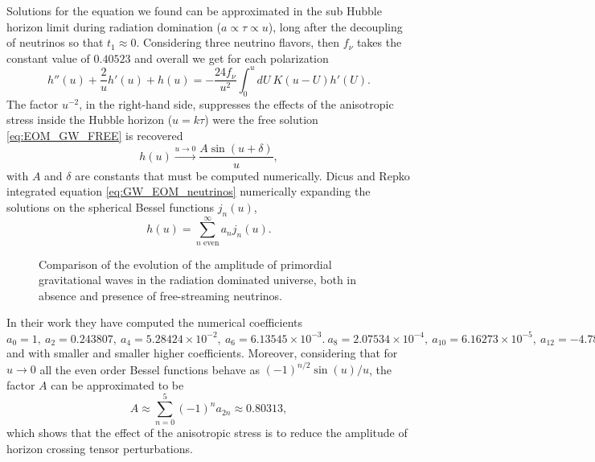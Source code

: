 Solutions for the equation we found can be approximated in the sub Hubble horizon limit during radiation domination ($a\propto\tau\propto u$), long after the decoupling of neutrinos so that $t_1\approx 0$. Considering three neutrino flavors, then $f_\nu$ takes the constant value of $0.40523$ and overall we get for each polarization
$$ h''(u)+\frac{2}{u}h'(u)+h(u)=-\frac{24f_\nu}{u^2}\int_{0}^{u}dU\ K(u-U)h'(U).$$
The factor $u^{-2}$, in the right-hand side, suppresses the effects of the anisotropic stress inside the Hubble horizon ($u=k\tau$) were the free solution \eqref{eq:EOM_GW_FREE} is recovered
$$h(u)\xrightarrow{u\to 0} \frac{A\sin(u+\delta)}{u},$$
with $A$ and $\delta$ are constants that must be computed numerically. Dicus and Repko \cite{Dicus_Repko} integrated equation \eqref{eq:GW_EOM_neutrinos} numerically expanding the solutions on the spherical Bessel functions $j_n(u)$,
\begin{equation}
    \label{eq:Tmodes_nu_damped}
    h(u)=\sum_{n\text{ even}}^{\infty}a_n j_n(u).
\end{equation}
\begin{figure}
    \centering
{}
\caption{Comparison of the evolution of the amplitude of primordial gravitational waves in the radiation dominated universe, both in absence and presence of free-streaming neutrinos. }
\label{fig:h_nu}
\end{figure}
 In their work they have computed the numerical coefficients $a_0=1,\ a_2=0.243807,\ a_4=5.28424\times10^{-2},\ a_6= 6.13545\times10^{-3}.\ a_8=2.07534\times10^{-4},\ a_{10}=6.16273\times10^{-5},\ a_{12}=-4.78885\times10^{-6}$ and with smaller and smaller higher coefficients. 
 Moreover, considering that for $u\to0$ all the even order Bessel functions behave as $(-1)^{n/2}\sin(u)/u$, the factor $A$ can be approximated to be
$$A\approx \sum_{n=0}^{5}(-1)^n a_{2n}\approx 0.80313,$$
which shows that the effect of the anisotropic stress is to reduce the amplitude of horizon crossing tensor perturbations.

